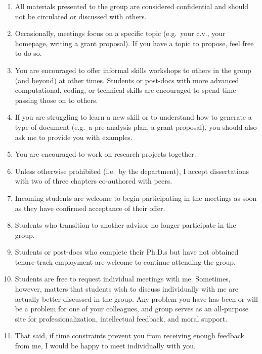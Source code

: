 \documentclass[12pt]{article}
\begin{document}
\begin{enumerate}
\item All materials presented to the group are considered confidential and should not be circulated or discussed with others.

\item Occasionally, meetings focus on a specific topic (e.g.\ your c.v., your homepage, writing a grant proposal). If you have a topic to propose, feel free to do so.

\item You are encouraged to offer informal skills workshops to others in the group (and beyond) at other times. Students or post-docs with more advanced computational, coding, or technical skills are encouraged to spend time passing those on to others.

\item If you are struggling to learn a new skill or to understand how to generate a type of document (e.g.\ a pre-analysis plan, a grant proposal), you should also ask me to provide you with examples.

\item You are encouraged to work on research projects together.

\item Unless otherwise prohibited (i.e.\ by the department), I accept dissertations with two of three chapters co-authored with peers.

\item Incoming students are welcome to begin participating in the meetings as soon as they have confirmed acceptance of their offer.

\item Students who transition to another advisor no longer participate in the group.

\item Students or post-docs who complete their Ph.D.s but have not obtained tenure-track employment are welcome to continue attending the group.

\item Students are free to request individual meetings with me. Sometimes, however, matters that students wish to discuss individually with me are actually better discussed in the group. Any problem you have has been or will be a problem for one of your colleagues, and group serves as an all-purpose site for professionalization, intellectual feedback, and moral support.

\item That said, if time constraints prevent you from receiving enough feedback from me, I would be happy to meet individually with you.


\end{enumerate}
\end{document}
